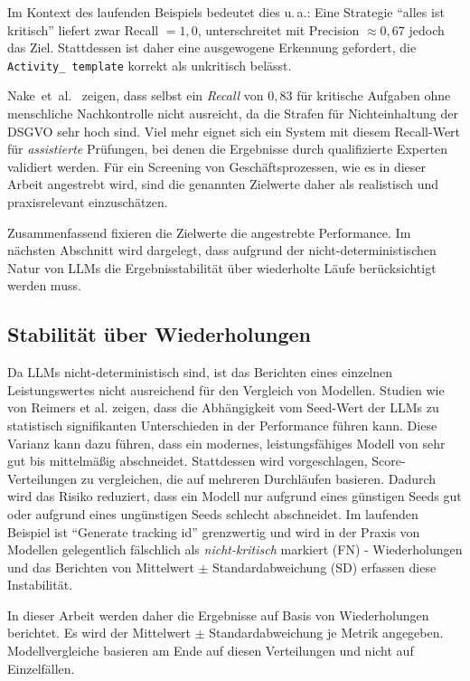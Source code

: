 Im Kontext des laufenden Beispiels bedeutet dies u.\,a.: Eine Strategie \enquote{alles ist kritisch} liefert zwar Recall $=1{,}0$, unterschreitet mit Precision $\approx 0{,}67$ jedoch das Ziel. Stattdessen ist daher eine ausgewogene Erkennung gefordert, die \texttt{Activity\_\linebreak~template} korrekt als unkritisch belässt.

Nake~et~al.\ \cite{nake2023towards} zeigen, dass selbst ein \emph{Recall} von $0{,}83$ für kritische Aufgaben ohne menschliche Nachkontrolle nicht ausreicht, da die Strafen für Nichteinhaltung der \ac{DSGVO} sehr hoch sind. Viel mehr eignet sich ein System mit diesem Recall-Wert für \emph{assistierte} Prüfungen, bei denen die Ergebnisse durch qualifizierte Experten validiert werden. Für ein Screening von Geschäftsprozessen, wie es in dieser Arbeit angestrebt wird, sind die genannten Zielwerte daher als realistisch und praxisrelevant einzuschätzen.

Zusammenfassend fixieren die Zielwerte die angestrebte Performance. Im nächsten Abschnitt wird dargelegt, dass aufgrund der nicht-deterministischen Natur von \acp{LLM} die Ergebnisstabilität über wiederholte Läufe berücksichtigt werden muss.

\subsection*{Stabilität über Wiederholungen}

Da \acp{LLM} nicht-deterministisch sind, ist das Berichten eines einzelnen Leistungswertes nicht ausreichend für den Vergleich von Modellen. Studien wie von Reimers et al. \cite{reimers2017reporting} zeigen, dass die Abhängigkeit vom Seed-Wert der \acp{LLM} zu statistisch signifikanten Unterschieden in der Performance führen kann. Diese Varianz kann dazu führen, dass ein modernes, leistungsfähiges Modell von sehr gut bis mittelmäßig abschneidet. Stattdessen wird vorgeschlagen, Score-Verteilungen zu vergleichen, die auf mehreren Durchläufen basieren. Dadurch wird das Risiko reduziert, dass ein Modell nur aufgrund eines günstigen Seeds gut oder aufgrund eines ungünstigen Seeds schlecht abschneidet. Im laufenden Beispiel ist \enquote{Generate tracking id} grenzwertig und wird in der Praxis von Modellen gelegentlich fälschlich als \emph{nicht-kritisch} markiert (\ac{FN}) - Wiederholungen und das Berichten von Mittelwert $\pm$ Standardabweichung (SD) erfassen diese Instabilität.

In dieser Arbeit werden daher die Ergebnisse auf Basis von Wiederholungen berichtet. Es wird der Mittelwert $\pm$ Standardabweichung je Metrik angegeben. Modellvergleiche basieren am Ende auf diesen Verteilungen und nicht auf Einzelfällen.